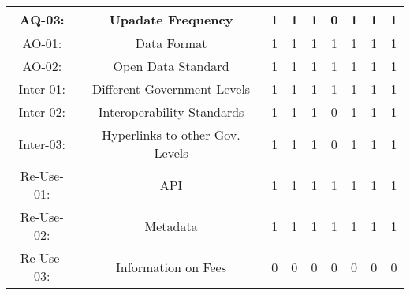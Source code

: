 \documentclass[a4paper, twoside]{report}
\begin{document}
\begin{table}[htbp]
\begin{adjustbox}{max width=\linewidth}
\begin{tabular}{rcccccccc}
    \multicolumn{1}{c}{AQ-03:} & \multicolumn{1}{p{19em}}{\cellcolor[rgb]{ .749,  .749,  .749}Upadate Frequency} & \cellcolor[rgb]{ .749,  .749,  .749}1 & \cellcolor[rgb]{ .749,  .749,  .749}1 & \cellcolor[rgb]{ .749,  .749,  .749}1 & \cellcolor[rgb]{ .749,  .749,  .749}0 & \cellcolor[rgb]{ .749,  .749,  .749}1 & \cellcolor[rgb]{ .749,  .749,  .749}1 & \cellcolor[rgb]{ .749,  .749,  .749}1 \\
    \midrule
    \multicolumn{1}{c}{AO-01:} & \multicolumn{1}{p{19em}}{Data Format} & 1     & 1     & 1     & 1     & 1     & 1     & 1 \\
    \multicolumn{1}{c}{AO-02:} & \multicolumn{1}{p{19em}}{\cellcolor[rgb]{ .749,  .749,  .749}Open Data Standard} & \cellcolor[rgb]{ .749,  .749,  .749}1 & \cellcolor[rgb]{ .749,  .749,  .749}1 & \cellcolor[rgb]{ .749,  .749,  .749}1 & \cellcolor[rgb]{ .749,  .749,  .749}1 & \cellcolor[rgb]{ .749,  .749,  .749}1 & \cellcolor[rgb]{ .749,  .749,  .749}1 & \cellcolor[rgb]{ .749,  .749,  .749}1 \\
    \midrule
    \multicolumn{1}{c}{Inter-01:} & \multicolumn{1}{p{19em}}{Different Government Levels} & 1     & 1     & 1     & 1     & 1     & 1     & 1 \\
    \multicolumn{1}{c}{Inter-02:} & \multicolumn{1}{p{19em}}{\cellcolor[rgb]{ .749,  .749,  .749}Interoperability Standards} & \cellcolor[rgb]{ .749,  .749,  .749}1 & \cellcolor[rgb]{ .749,  .749,  .749}1 & \cellcolor[rgb]{ .749,  .749,  .749}1 & \cellcolor[rgb]{ .749,  .749,  .749}0 & \cellcolor[rgb]{ .749,  .749,  .749}1 & \cellcolor[rgb]{ .749,  .749,  .749}1 & \cellcolor[rgb]{ .749,  .749,  .749}1 \\
    \multicolumn{1}{c}{Inter-03:} & \multicolumn{1}{p{19em}}{\cellcolor[rgb]{ .749,  .749,  .749}Hyperlinks to other Gov. Levels} & \cellcolor[rgb]{ .749,  .749,  .749}1 & \cellcolor[rgb]{ .749,  .749,  .749}1 & \cellcolor[rgb]{ .749,  .749,  .749}1 & \cellcolor[rgb]{ .749,  .749,  .749}0 & \cellcolor[rgb]{ .749,  .749,  .749}1 & \cellcolor[rgb]{ .749,  .749,  .749}1 & \cellcolor[rgb]{ .749,  .749,  .749}1 \\
    \midrule
    \multicolumn{1}{c}{Re-Use-01:} & \multicolumn{1}{p{19em}}{API} & 1     & 1     & 1     & 1     & 1     & 1     & 1 \\
    \multicolumn{1}{c}{Re-Use-02:} & \multicolumn{1}{p{19em}}{Metadata} & 1     & 1     & 1     & 1     & 1     & 1     & 1 \\
    \multicolumn{1}{c}{Re-Use-03:} & \multicolumn{1}{p{19em}}{Information on Fees} & 0     & 0     & 0     & 0     & 0     & 0     & 0 \\

\end{tabular}
\end{adjustbox}
\end{table}
\end{document}
